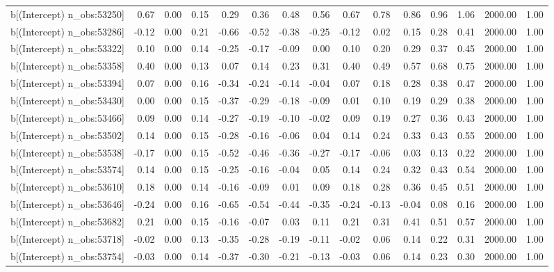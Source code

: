 \begin{table}[ht]
\begin{tabular}{rrrrrrrrrrrrrrr}
  b[(Intercept) n\_obs:53250] & 0.67 & 0.00 & 0.15 & 0.29 & 0.36 & 0.48 & 0.56 & 0.67 & 0.78 & 0.86 & 0.96 & 1.06 & 2000.00 & 1.00 \\ 
  b[(Intercept) n\_obs:53286] & -0.12 & 0.00 & 0.21 & -0.66 & -0.52 & -0.38 & -0.25 & -0.12 & 0.02 & 0.15 & 0.28 & 0.41 & 2000.00 & 1.00 \\ 
  b[(Intercept) n\_obs:53322] & 0.10 & 0.00 & 0.14 & -0.25 & -0.17 & -0.09 & 0.00 & 0.10 & 0.20 & 0.29 & 0.37 & 0.45 & 2000.00 & 1.00 \\ 
  b[(Intercept) n\_obs:53358] & 0.40 & 0.00 & 0.13 & 0.07 & 0.14 & 0.23 & 0.31 & 0.40 & 0.49 & 0.57 & 0.68 & 0.75 & 2000.00 & 1.00 \\ 
  b[(Intercept) n\_obs:53394] & 0.07 & 0.00 & 0.16 & -0.34 & -0.24 & -0.14 & -0.04 & 0.07 & 0.18 & 0.28 & 0.38 & 0.47 & 2000.00 & 1.00 \\ 
  b[(Intercept) n\_obs:53430] & 0.00 & 0.00 & 0.15 & -0.37 & -0.29 & -0.18 & -0.09 & 0.01 & 0.10 & 0.19 & 0.29 & 0.38 & 2000.00 & 1.00 \\ 
  b[(Intercept) n\_obs:53466] & 0.09 & 0.00 & 0.14 & -0.27 & -0.19 & -0.10 & -0.02 & 0.09 & 0.19 & 0.27 & 0.36 & 0.43 & 2000.00 & 1.00 \\ 
  b[(Intercept) n\_obs:53502] & 0.14 & 0.00 & 0.15 & -0.28 & -0.16 & -0.06 & 0.04 & 0.14 & 0.24 & 0.33 & 0.43 & 0.55 & 2000.00 & 1.00 \\ 
  b[(Intercept) n\_obs:53538] & -0.17 & 0.00 & 0.15 & -0.52 & -0.46 & -0.36 & -0.27 & -0.17 & -0.06 & 0.03 & 0.13 & 0.22 & 2000.00 & 1.00 \\ 
  b[(Intercept) n\_obs:53574] & 0.14 & 0.00 & 0.15 & -0.25 & -0.16 & -0.04 & 0.05 & 0.14 & 0.24 & 0.32 & 0.43 & 0.54 & 2000.00 & 1.00 \\ 
  b[(Intercept) n\_obs:53610] & 0.18 & 0.00 & 0.14 & -0.16 & -0.09 & 0.01 & 0.09 & 0.18 & 0.28 & 0.36 & 0.45 & 0.51 & 2000.00 & 1.00 \\ 
  b[(Intercept) n\_obs:53646] & -0.24 & 0.00 & 0.16 & -0.65 & -0.54 & -0.44 & -0.35 & -0.24 & -0.13 & -0.04 & 0.08 & 0.16 & 2000.00 & 1.00 \\ 
  b[(Intercept) n\_obs:53682] & 0.21 & 0.00 & 0.15 & -0.16 & -0.07 & 0.03 & 0.11 & 0.21 & 0.31 & 0.41 & 0.51 & 0.57 & 2000.00 & 1.00 \\ 
  b[(Intercept) n\_obs:53718] & -0.02 & 0.00 & 0.13 & -0.35 & -0.28 & -0.19 & -0.11 & -0.02 & 0.06 & 0.14 & 0.22 & 0.31 & 2000.00 & 1.00 \\ 
  b[(Intercept) n\_obs:53754] & -0.03 & 0.00 & 0.14 & -0.37 & -0.30 & -0.21 & -0.13 & -0.03 & 0.06 & 0.14 & 0.23 & 0.30 & 2000.00 & 1.00 \\ 

\end{tabular}
\end{table}
